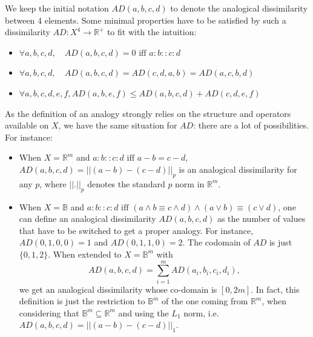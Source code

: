 We keep the initial notation $AD(a,b,c,d)$ to denote the analogical
dissimilarity between 4 elements.  Some  minimal properties have to be
satisfied by such a dissimilarity $AD: X^4 \longrightarrow \mathbb{R}^+$ to fit
with the intuition: \begin{itemize}
\item $\forall a, b, c, d, \quad  AD(a,b,c,d)=0 \mbox{ iff } a:b::c:d$
\item $\forall a, b, c, d, \quad  AD(a,b,c,d)=AD(c,d,a,b)=AD(a,c,b,d)$
\item $\forall a, b, c, d, e, f,  AD(a,b,e,f) \leq AD(a,b,c,d) + AD(c,d,e,f)$
\end{itemize}
As the definition of an analogy strongly relies on the structure and operators
available on $X$, we have the same situation for $AD$: there are a lot of
possibilities. For instance:
\begin{itemize}
\item When $X=\mathbb{R}^m$ and $a:b::c:d \mbox{ iff } a-b=c-d$, $AD(a,b,c,d) =
  ||(a-b)-(c-d)||_p$ is an analogical dissimilarity for any $p$,
  where $||.||_p$ denotes the standard $p$ norm  in $\mathbb{R}^m$.
\item
When $X=\mathbb{B}$ and $a:b::c:d \mbox{ iff } (a \wedge b \equiv c
  \wedge d) \wedge (a \vee  b) \equiv (c \vee d)$, one can define an analogical
  dissimilarity $AD(a,b,c,d)$ as the number of values that have to be switched
  to get a proper analogy. For instance, $AD(0,1,0,0)=1$ and $AD(0,1,1,0)=2$.
The codomain of $AD$ is just $\{0, 1, 2\}$. When extended to
  $X=\mathbb{B}^m$ with $$AD(a,b,c,d) = \sum\limits_{i=1}^m AD(a_i,b_i,c_i,d_i),$$
  we get an analogical dissimilarity whose co-domain is $[0, 2m]$. In fact,
  this definition is just the restriction to $\mathbb{B}^m$ of the one coming
  from $\mathbb{R}^m$, when considering that $\mathbb{B}^m \subseteq
  \mathbb{R}^m$ and using the $L_1$ norm, i.e. $AD(a,b,c,d) = ||(a-b)-(c-d)||_1$.
\end{itemize}

